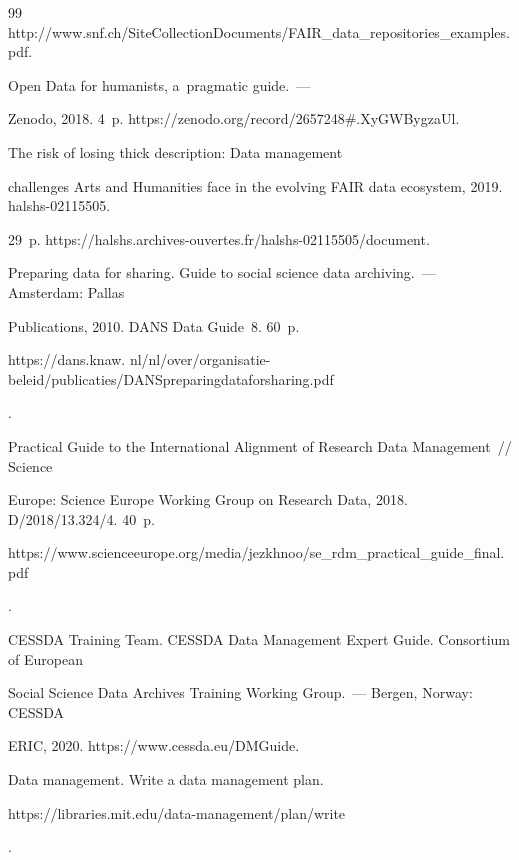 {{\begin{thebibliography}{99}
{http://www.snf.ch/SiteCollectionDocuments/FAIR\_data\_repositories\_examples.pdf}.


 Open Data for humanists, a~pragmatic guide.~--- 

Zenodo, 2018. 4~p. {\sf https://zenodo.org/record/2657248\#.XyGWBygzaUl}.


 The risk of losing thick description: Data management 

challenges Arts and Humanities face in the evolving FAIR data ecosystem, 2019. halshs-02115505. 

29~p. {\sf https://halshs.archives-ouvertes.fr/halshs-02115505/document}.




Preparing data for sharing. Guide to social science data archiving.~--- Amsterdam: Pallas 

Publications, 2010. DANS Data Guide~8. 60~p. {\sf  

https://dans.knaw. nl/nl/over/organisatie-beleid/publicaties/DANSpreparingdataforsharing.pdf}.


Practical Guide to the International Alignment of Research Data Management~/\!\!/ Science 

Europe: Science Europe Working Group on Research Data, 2018. D/2018/13.324/4. 40~p. {\sf 

https://www.scienceeurope.org/media/jezkhnoo/\linebreak se\_rdm\_practical\_guide\_final.pdf}.




CESSDA Training Team. CESSDA Data Management Expert Guide. Consortium of European 

Social Science Data Archives  Training Working Group.~--- Bergen, Norway: CESSDA 

ERIC, 2020. {\sf https://www.cessda.eu/DMGuide}.




Data management. Write a data management plan. {\sf  

https://libraries.mit.edu/data-management/plan/write}.



\end{thebibliography}}}
